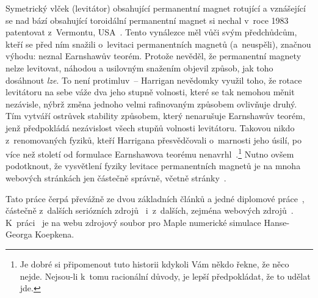 Symetrický vlček (levitátor) obsahující permanentní magnet rotující a
vznášející se nad bází obsahující toroidální permanentní magnet si nechal
v~roce 1983 patentovat  z~Vermontu,
USA~\cite{USpatent4.382.245}. Tento vynálezce měl vůči svým předchůdcům, kteří
se před ním snažili o~levitaci permanentních magnetů (a~neuspěli), značnou
výhodu: neznal Earnshawův teorém. Protože nevěděl, že permanentní magnety
nelze levitovat, náhodou a usilovným snažením objevil způsob, jak toho
dosáhnout \emph{lze}. To není protimluv~-- Harrigan nevědomky využil toho, že
rotace levitátoru na sebe váže dva jeho stupně volnosti, které se tak nemohou
měnit nezávisle, nýbrž změna jednoho velmi rafinovaným způsobem ovlivňuje
druhý. Tím vytváří ostrůvek stability způsobem, který nenarušuje Earnshawův
teorém, jenž předpokládá nezávislost všech stupňů volnosti levitátoru. Takovou
 nikdo z~renomovaných fyziků, kteří Harrigana
přesvědčovali o~marnosti jeho úsilí, po více než století od formulace
Earnshawova teorému nenavrhl~\cite{Gra:LIVE:Levit:IgnMagBliss}.\footnote{Je
  dobré si připomenout tuto historii kdykoli Vám někdo řekne, že něco
  nejde. Nejsou-li k~tomu racionální důvody, je lepší předpokládat, že to
  udělat jde.} Nutno ovšem podotknout, že vysvětlení fyziky levitace
permanentních magnetů je na mnoha webových stránkách jen částečně správně,
včetně stránky~\cite{Fas:LIVE:Levit:Levitron}.

Tato práce čerpá převážně ze dvou základních článků a jedné diplomové
práce~\cite{Sim-Hef-Rid:1997:AMEJP:SpStMagLev,%
  Ber:1996:PRORSA:LevitAdiaTrapSp,%
  Hab:1999:MgrDP:ProbUlFyzPrakt},
částečně z~dalších seriózních
zdrojů~\cite{Caz-Nem:2010:REVRS:NovConPerMagLev,%
  Dul-Eas:1999:ZANGM1:StabOfLevit,%
  Fla-etal:1999:PHYSD:SpiMoHovMaTop,%
  Fre:2010:PHYSED:WondersLevit,%
  Gan-Jon-Was:1998:JPHYSD:DynOfLevi,%
  Gen-Del-Ron:1999:MECJI:GyStaPasMagLev,%
  Gov-Sht-Tho:1999:PHYSD:DyStHoMagTop,%
  Gov-Sht:1999:phys9902002:HowHiUCAS,%
  Jon-Was-Gans:1997:JAPPPH:SimpTheoLevi}
i~z~dalších, zejména webových
zdrojů~\cite{Ber:LIVE:Levit:LevitronPhys,%
  Bor:LIVE:Levit:OptRotLevi}. K~práci~\cite{Gan-Jon-Was:1998:JPHYSD:DynOfLevi}
je na webu zdrojový soubor  pro Maple numerické simulace
Hanse-Georga Koepkena.

